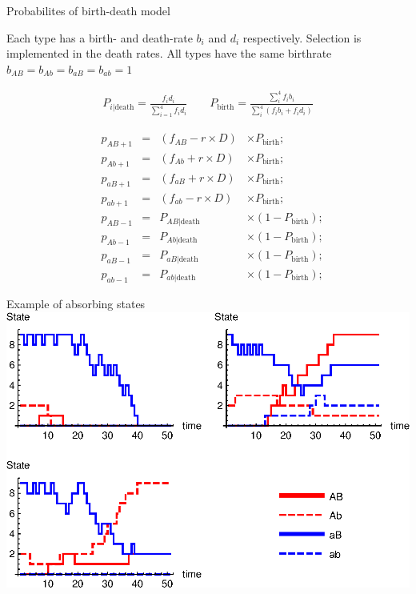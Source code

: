 \documentclass{beamer}
\begin{document}
\begin{frame}{Probabilites of birth-death model}

\footnotesize
Each type has a birth- and death-rate $b_i$ and $d_i$ respectively. Selection is implemented in the death rates. All types have the same birthrate $b_{AB}=b_{Ab}=b_{aB}=b_{ab} =1$  

    \begin{equation*}
    \begin{aligned}
        P_{i|\text{death}}=\frac{f_id_i}{\sum_{i=1}^4 f_id_i} \qquad P_\text{birth} = \frac{\sum_i^4 f_i b_i}{\sum_i^4 (f_i b_i + f_i d_i)} 
    \end{aligned}
    \end{equation*}
    
    \begin{equation*}
    \begin{aligned}
        &p_{AB+1} & =& (f_{AB}-r\times D) & \times P_\text{birth};\\
        &p_{Ab+1} & =& (f_{Ab}+r\times D) & \times P_\text{birth};\\
        &p_{aB+1} & =& (f_{aB}+r\times D) & \times P_\text{birth};\\
        &p_{ab+1} & =& (f_{ab}-r\times D) & \times P_\text{birth};\\
        &p_{AB-1} & =& P_{AB|\text{death}} & \times (1-P_\text{birth}); \\
        &p_{Ab-1} & =& P_{Ab|\text{death}} & \times (1-P_\text{birth}); \\
        &p_{aB-1} & =& P_{aB|\text{death}} & \times (1-P_\text{birth}); \\
        &p_{ab-1} & =& P_{ab|\text{death}} & \times (1-P_\text{birth}); 
    \end{aligned}
    \end{equation*} 

    
\normalsize
 
\end{frame}

\begin{frame}{Example of absorbing states}
    \includegraphics[width=1.0\textwidth]{Matlab/Figures/gridplot.eps}
\end{frame}
\end{document}
